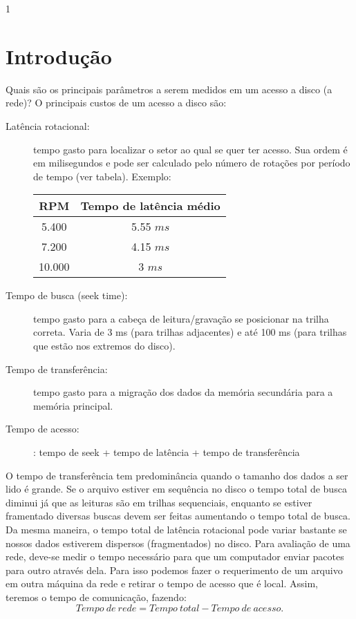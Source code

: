 1\documentclass[10pt,a4paper]{article}
\begin{document}
\section{Introdução}
Quais são os principais parâmetros a serem medidos em um acesso a
disco (a rede)?
O principais custos de um acesso a disco são:
\begin{description}
\item [Latência rotacional:] tempo gasto para localizar o 
setor ao qual se quer ter acesso. Sua ordem é em milisegundos e pode
ser calculado pelo número de rotações por período de tempo (ver
tabela). Exemplo:

\begin{table}[h!]
\begin{center}
\begin{tabular}{cc}
\hline
\hline
RPM &  Tempo de latência médio \\
\hline
5.400 & 5.55 $ms$ \\
7.200 & 4.15 $ms$\\
10.000 & 3 $ms$
\end{tabular}
\end{center}
\end{table}

\item [Tempo de busca (seek time):] tempo gasto para a cabeça de 
leitura/gravação se posicionar na trilha correta. Varia de 3 ms (para trilhas adjacentes) e até 100 ms (para trilhas que estão nos extremos do disco).

\item[Tempo de transferência:]  tempo gasto para a 
migração dos dados da memória secundária para a 
memória principal.

\item[Tempo de acesso:]: tempo de seek + tempo de latência + tempo de transferência
\end{description}

O tempo de transferência tem predominância quando o tamanho dos dados
a ser lido é grande.
Se o arquivo estiver em sequência no disco o tempo total de busca diminui
já que as leituras são em trilhas sequenciais, enquanto se estiver
framentado diversas buscas devem ser feitas aumentando o tempo total
de busca.
Da mesma maneira, o tempo total de latência rotacional pode variar bastante
se nossos dados estiverem dispersos (fragmentados) no disco. 
Para  avaliação de uma rede, deve-se medir o tempo necessário para que um computador
enviar pacotes para outro através dela. Para isso podemos fazer o requerimento 
de um arquivo em outra máquina da rede e retirar o tempo de acesso que é local.
Assim, teremos o tempo de comunicação, fazendo:
\begin{equation}
  Tempo~de~rede = Tempo~total - Tempo~de~acesso. 
\end{equation}
\end{document}

